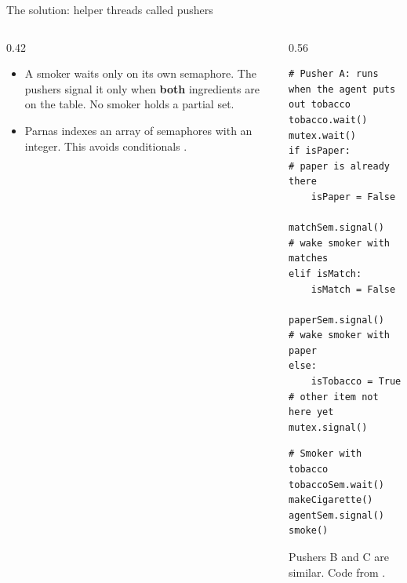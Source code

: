 \documentclass[aspectratio=169,10pt,xcolor=table]{beamer}
\newcommand{\code}[1]{\texttt{#1}}
\begin{document}
\begin{frame}[fragile]{The solution: helper threads called pushers}
    \begin{columns}[T]
        \begin{column}{0.42\textwidth}
            \centering

            \vspace{3pt}
            \footnotesize
            \begin{itemize}
                \setlength\itemsep{1pt}
                \item A smoker waits only on its own semaphore. The pushers signal
                    it only when \textbf{both} ingredients are on the table. No
                    smoker holds a partial set.
                \item Parnas indexes an array of semaphores with an integer. This
                    avoids conditionals \cite{parnas,downey}.
            \end{itemize}
        \end{column}
        \begin{column}{0.56\textwidth}
\begin{lstlisting}
# Pusher A: runs when the agent puts out tobacco
tobacco.wait()
mutex.wait()
if isPaper:                # paper is already there
    isPaper = False
    matchSem.signal()      # wake smoker with matches
elif isMatch:
    isMatch = False
    paperSem.signal()      # wake smoker with paper
else:
    isTobacco = True       # other item not here yet
mutex.signal()
\end{lstlisting}
\begin{lstlisting}
# Smoker with tobacco
tobaccoSem.wait()
makeCigarette()
agentSem.signal()
smoke()
\end{lstlisting}
            \vspace{2pt}
            \footnotesize Pushers B and C are similar. Code from \cite{downey}.
        \end{column}
    \end{columns}
\end{frame}
\end{document}

